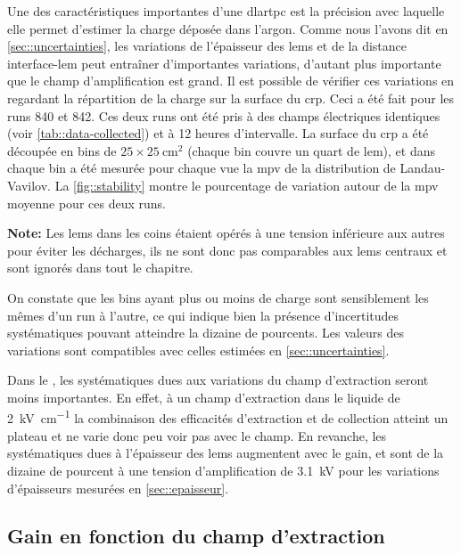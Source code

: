         Une des caractéristiques importantes d'une \gls{dlartpc} est la précision avec laquelle elle permet d'estimer la charge déposée dans l'argon. Comme nous l'avons dit en \autoref{sec::uncertainties}, les variations de l'épaisseur des \glspl{lem} et de la distance interface-\gls{lem} peut entraîner d'importantes variations, d'autant plus importante que le champ d'amplification est grand. Il est possible de vérifier ces variations en regardant la répartition de la charge sur la surface du \gls{crp}. Ceci a été fait pour les runs 840 et 842. Ces deux runs ont été pris à des champs électriques identiques (voir \autoref{tab::data-collected}) et à 12 heures d'intervalle. La surface du \gls{crp} a été découpée en bins de $25\times\SI{25}{\centi\meter\squared}$ (chaque bin couvre un quart de \gls{lem}), et dans chaque bin a été mesurée pour chaque vue la \gls{mpv} de la distribution de Landau-Vavilov. La \autoref{fig::stability} montre le pourcentage de variation autour de la \gls{mpv} moyenne pour ces deux runs. 

        \textbf{Note:} Les \glspl{lem} dans les coins étaient opérés à une tension inférieure aux autres pour éviter les décharges, ils ne sont donc pas comparables aux \glspl{lem} centraux et sont ignorés dans tout le chapitre.
    
        On constate que les bins ayant plus ou moins de charge sont sensiblement les mêmes d'un run à l'autre, ce qui indique bien la présence d'incertitudes systématiques pouvant atteindre la dizaine de pourcents. Les valeurs des variations sont compatibles avec celles estimées en \autoref{sec::uncertainties}.

        Dans le \SSS{}, les systématiques dues aux variations du champ d'extraction seront moins importantes. En effet, à un champ d'extraction dans le liquide de \SI{2}{\kilo\volt\per\centi\meter} la combinaison des efficacités d'extraction et de collection atteint un plateau et ne varie donc peu voir pas avec le champ. En revanche, les systématiques dues à l'épaisseur des \glspl{lem} augmentent avec le gain, et sont de la dizaine de pourcent à une tension d'amplification de \SI{3.1}{\kilo\volt} pour les variations d'épaisseurs mesurées en \autoref{sec::epaisseur}.

    \subsection{Gain en fonction du champ d'extraction}\label{sec::result_extr}


